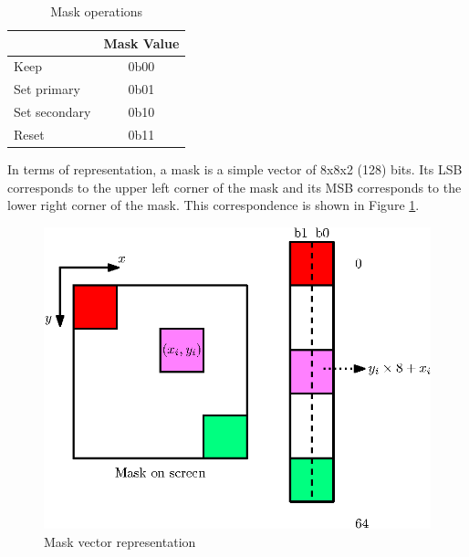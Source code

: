 \begin{table}[H]
    \centering
    \begin{tabular}{|l|c|}
    \hline
    \rowcolor[HTML]{DAE8FC} 
    \multicolumn{1}{|c|}{\cellcolor[HTML]{DAE8FC}\textbf{Mask Operation}} & \textbf{Mask Value} \\ \hline
    Keep                                                                  & 0b00                \\ \hline
    Set primary                                                           & 0b01                \\ \hline
    Set secondary                                                         & 0b10                \\ \hline
    Reset                                                                 & 0b11                \\ \hline
    \end{tabular}
    \caption{Mask operations}
    \label{tab:mask_op}
\end{table}

In terms of representation, a mask is a simple vector of 8x8x2 (128) bits. Its LSB corresponds to 
the upper left corner of the mask and its MSB corresponds to the lower right corner of the mask. 
This correspondence is shown in Figure \ref{fig:gpu/mask_vector}.

\begin{figure}[H]
    \centering
    \includegraphics[scale=1.0]{Chapter4-GPU_CLKU/res/mask_vector}
    \caption{Mask vector representation}
    \label{fig:gpu/mask_vector}
\end{figure}

